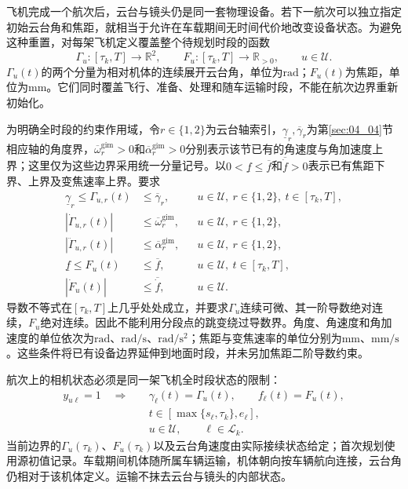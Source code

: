 飞机完成一个航次后，云台与镜头仍是同一套物理设备。若下一航次可以独立指定初始云台角和焦距，就相当于允许在车载期间无时间代价地改变设备状态。为避免这种重置，对每架飞机定义覆盖整个待规划时段的函数
\begin{equation}
 \Gamma_u:[\tau_k,T]\longrightarrow\mathbb R^2,
 \qquad
 F_u:[\tau_k,T]\longrightarrow\mathbb R_{>0},
 \qquad u\in\mathcal U.
 \label{s0504:global_camera_states}
\end{equation}
$\Gamma_u(t)$的两个分量为相对机体的连续展开云台角，单位为$\mathrm{rad}$；$F_u(t)$为焦距，单位为$\mathrm{mm}$。它们同时覆盖飞行、准备、处理和随车运输时段，不能在航次边界重新初始化。

为明确全时段的约束作用域，令$r\in\{1,2\}$为云台轴索引，$\underline\gamma_r,\overline\gamma_r$为第\ref{sec:04_04}节相应轴的角度界，$\overline\omega_r^{\mathrm{gim}}>0$和$\overline\alpha_r^{\mathrm{gim}}>0$分别表示该节已有的角速度与角加速度上界；这里仅为这些边界采用统一分量记号。以$0<\underline f\le\overline f$和$\overline{\dot f}>0$表示已有焦距下界、上界及变焦速率上界。要求
\begin{align}
 \underline\gamma_r\le\Gamma_{u,r}(t)
 &\le\overline\gamma_r,
 &&u\in\mathcal U,\ r\in\{1,2\},\ t\in[\tau_k,T],
 \label{s0504:global_gimbal_range}\\
 |\dot\Gamma_{u,r}(t)|&\le\overline\omega_r^{\mathrm{gim}},
 &&u\in\mathcal U,\ r\in\{1,2\},
 \label{s0504:global_gimbal_rate}\\
 |\ddot\Gamma_{u,r}(t)|&\le\overline\alpha_r^{\mathrm{gim}},
 &&u\in\mathcal U,\ r\in\{1,2\},
 \label{s0504:global_gimbal_acceleration}\\
 \underline f\le F_u(t)&\le\overline f,
 &&u\in\mathcal U,\ t\in[\tau_k,T],
 \label{s0504:global_focal_range}\\
 |\dot F_u(t)|&\le\overline{\dot f},
 &&u\in\mathcal U.
 \label{s0504:global_focal_rate}
\end{align}
导数不等式在$[\tau_k,T]$上几乎处处成立，并要求$\Gamma_u$连续可微、其一阶导数绝对连续，$F_u$绝对连续。因此不能利用分段点的跳变绕过导数界。角度、角速度和角加速度的单位依次为$\mathrm{rad}$、$\mathrm{rad/s}$、$\mathrm{rad/s^2}$；焦距与变焦速率的单位分别为$\mathrm{mm}$、$\mathrm{mm/s}$。这些条件将已有设备边界延伸到地面时段，并未另加焦距二阶导数约束。

航次上的相机状态必须是同一架飞机全时段状态的限制：
\begin{equation}
 \begin{aligned}
 y_{u\ell}=1\quad\Longrightarrow\quad
 &\gamma_\ell(t)=\Gamma_u(t),\qquad f_\ell(t)=F_u(t),\\
 &t\in[\max\{s_\ell,\tau_k\},e_\ell],\\
 &u\in\mathcal U,\qquad\ell\in\mathcal L_k.
 \end{aligned}
 \label{s0504:sortie_camera_restriction}
\end{equation}
当前边界的$\Gamma_u(\tau_k)$、$F_u(\tau_k)$以及云台角速度由实际接续状态给定；首次规划使用源初值记录。车载期间机体随所属车辆运输，机体朝向按车辆航向连接，云台角仍相对于该机体定义。运输不抹去云台与镜头的内部状态。

